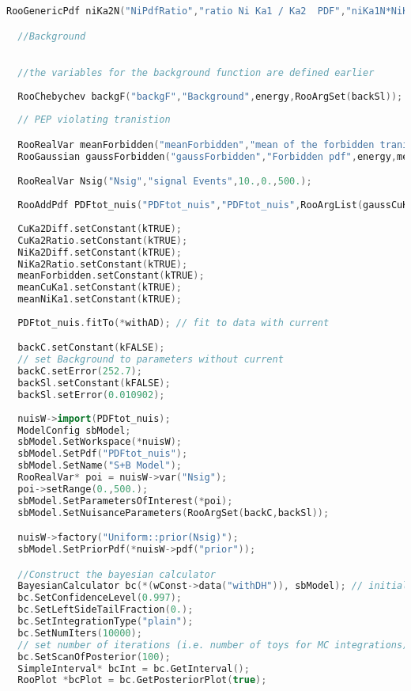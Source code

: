 \begin{appendices}
\begin{lstlisting}[language=C++]
  RooGenericPdf niKa2N("NiPdfRatio","ratio Ni Ka1 / Ka2  PDF","niKa1N*NiKa2Ratio",RooArgSet(niKa1N,NiKa2Ratio)); 

  //Background
  

  //the variables for the background function are defined earlier
  
  RooChebychev backgF("backgF","Background",energy,RooArgSet(backSl));
  
  // PEP violating tranistion

  RooRealVar meanForbidden("meanForbidden","mean of the forbidden tranistion", 7729, 7728.,7730.);
  RooGaussian gaussForbidden("gaussForbidden","Forbidden pdf",energy,meanForbidden,sigmaCuKa);

  RooRealVar Nsig("Nsig","signal Events",10.,0.,500.);
  
  RooAddPdf PDFtot_nuis("PDFtot_nuis","PDFtot_nuis",RooArgList(gaussCuKa1,gaussCuKa2,gaussNiKa1,gaussNiKa2,backgF,gaussForbidden),RooArgList(cuKa1N,cuKa2N,niKa1N,niKa2N,backC,Nsig));
  
  CuKa2Diff.setConstant(kTRUE);
  CuKa2Ratio.setConstant(kTRUE);
  NiKa2Diff.setConstant(kTRUE);
  NiKa2Ratio.setConstant(kTRUE);
  meanForbidden.setConstant(kTRUE); 
  meanCuKa1.setConstant(kTRUE);
  meanNiKa1.setConstant(kTRUE);
  
  PDFtot_nuis.fitTo(*withAD); // fit to data with current

  backC.setConstant(kFALSE); 
  // set Background to parameters without current
  backC.setError(252.7);
  backSl.setConstant(kFALSE);
  backSl.setError(0.010902);
  
  nuisW->import(PDFtot_nuis);
  ModelConfig sbModel;
  sbModel.SetWorkspace(*nuisW);
  sbModel.SetPdf("PDFtot_nuis"); 
  sbModel.SetName("S+B Model");
  RooRealVar* poi = nuisW->var("Nsig");
  poi->setRange(0.,500.); 
  sbModel.SetParametersOfInterest(*poi);
  sbModel.SetNuisanceParameters(RooArgSet(backC,backSl));

  nuisW->factory("Uniform::prior(Nsig)"); 
  sbModel.SetPriorPdf(*nuisW->pdf("prior"));

  //Construct the bayesian calculator
  BayesianCalculator bc(*(wConst->data("withDH")), sbModel); // initialize with data taken with current
  bc.SetConfidenceLevel(0.997);
  bc.SetLeftSideTailFraction(0.); 
  bc.SetIntegrationType("plain");  
  bc.SetNumIters(10000); 
  // set number of iterations (i.e. number of toys for MC integrations)
  bc.SetScanOfPosterior(100);
  SimpleInterval* bcInt = bc.GetInterval();
  RooPlot *bcPlot = bc.GetPosteriorPlot(true);
  
\end{lstlisting}
  
\end{appendices}